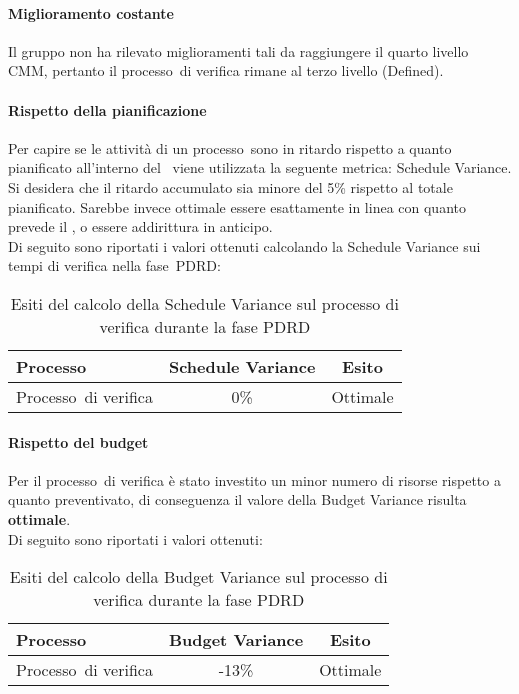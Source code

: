 \documentclass[../PianoDiQualifica.tex]{subfiles}
\begin{document}
\begin{appendices}
			\paragraph{Miglioramento costante}
			Il gruppo non ha rilevato miglioramenti tali da raggiungere il quarto livello CMM\g, pertanto il processo\g\ di verifica rimane al terzo livello (Defined).
			
			\paragraph{Rispetto della pianificazione}
			Per capire se le attività di un processo\g\ sono in ritardo rispetto a quanto pianificato all'interno del \pianodiprogetto\ viene utilizzata la seguente metrica: Schedule Variance.\\
			Si desidera che il ritardo accumulato sia minore del 5\% rispetto al totale pianificato. Sarebbe invece ottimale essere esattamente in linea con quanto prevede il \pianodiprogetto, o essere addirittura in anticipo.\\
			Di seguito sono riportati i valori ottenuti calcolando la Schedule Variance sui tempi di verifica nella fase\g\ PDRD:
			
			\begin{table}[H]
				\centering
				\begin{tabular}{l * {2}{c}}
					\toprule
					\textbf{Processo} & \textbf{Schedule Variance} & \textbf{Esito} \\
					\midrule
					Processo\g\ di verifica & 0\% &  Ottimale \\
					\bottomrule
				\end{tabular}
				\caption{Esiti del calcolo della Schedule Variance sul processo di verifica durante la fase PDRD}
				\label{tab:esiti_schedule_variance}
			\end{table}
			
			\paragraph{Rispetto del budget}
			Per il processo\g\ di verifica è stato investito un minor numero di risorse rispetto a quanto preventivato, di conseguenza il valore della Budget Variance risulta \textbf{ottimale}.\\
			Di seguito sono riportati i valori ottenuti:
			\begin{table}[H]
				\centering
				\begin{tabular}{l * {2}{c}}
					\toprule
					\textbf{Processo} & \textbf{Budget Variance} & \textbf{Esito} \\
					\midrule
					Processo\g\ di verifica & -13\% &  Ottimale \\
					\bottomrule
				\end{tabular}
				\caption{Esiti del calcolo della Budget Variance sul processo di verifica durante la fase PDRD}
				\label{tab:esiti_budget_variance}
			\end{table}
	

\end{appendices}
\end{document}
